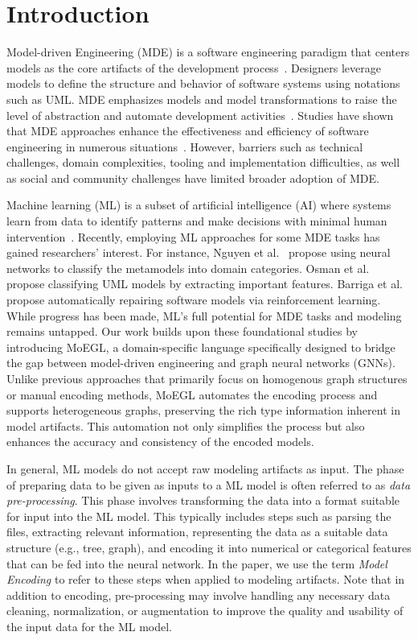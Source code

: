 \documentclass[journal,article,submit,moreauthors,technologies]{Definitions/mdpi}
\begin{document}
\section{Introduction}\label{sec1}
Model-driven Engineering (MDE) is a software engineering paradigm that centers models as the core artifacts of the development process~\cite{brambilla2017model}. Designers leverage models to define the structure and behavior of software systems using notations such as UML. MDE emphasizes models and model transformations to raise the level of abstraction and automate development activities~\cite{mellor2003guest}. Studies have shown that MDE approaches enhance the effectiveness and efficiency of software engineering in numerous situations~\cite{whittle2013state}. However, barriers such as technical challenges, domain complexities, tooling and implementation difficulties, as well as social and community challenges have limited broader adoption of MDE.

Machine learning (ML) is a subset of artificial intelligence (AI) where systems learn from data to identify patterns and make decisions with minimal human intervention~\cite{panat2023introduction}. Recently, employing ML approaches for some MDE tasks has gained researchers' interest. For instance, Nguyen et al.~\cite{nguyen2019automated} propose using neural networks to classify the metamodels into domain categories. Osman et al.~\cite{osman2018automated} propose classifying UML models by extracting important features. Barriga et al.~\cite{barriga2019personalized} propose automatically repairing software models via reinforcement learning. While progress has been made, ML's full potential for MDE tasks and modeling remains untapped. Our work builds upon these foundational studies by introducing MoEGL, a domain-specific language specifically designed to bridge the gap between model-driven engineering and graph neural networks (GNNs). Unlike previous approaches that primarily focus on homogenous graph structures or manual encoding methods, MoEGL automates the encoding process and supports heterogeneous graphs, preserving the rich type information inherent in model artifacts. This automation not only simplifies the process but also enhances the accuracy and consistency of the encoded models.

In general, ML models do not accept raw modeling artifacts as input. The phase of preparing data to be given as inputs to a ML model is often referred to as \emph{data pre-processing}. This phase involves transforming the data into a format suitable for input into the ML model. This typically includes steps such as parsing the files, extracting relevant information, representing the data as a suitable data structure (e.g., tree, graph), and encoding it into numerical or categorical features that can be fed into the neural network. In the paper, we use the term \emph{Model Encoding} to refer to these steps when applied to modeling artifacts. Note that in addition to encoding, pre-processing may involve handling any necessary data cleaning, normalization, or augmentation to improve the quality and usability of the input data for the ML model.
\end{document}
